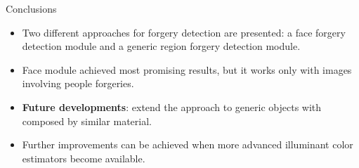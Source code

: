 \begin{tframe}{Conclusions}
\begin{itemize}
\vspace{0.1cm}
\item Two different approaches for forgery detection are presented: a face forgery detection module and a generic region forgery detection module.
\vspace{0.1cm}
\item Face module achieved most promising results, but it works only with images involving people forgeries.
\vspace{0.1cm}
\item \textbf{Future developments}: extend the approach to generic objects with composed by similar material.
\vspace{0.1cm}
\item Further improvements can be achieved when more advanced illuminant color estimators become available.
\end{itemize}
\end{tframe}
